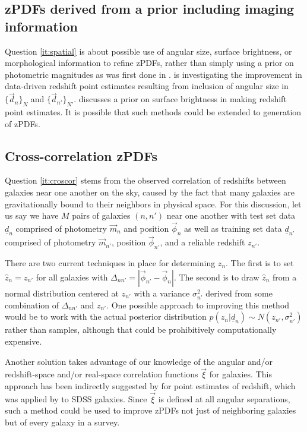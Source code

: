 \documentclass[12pt, onecolumn]{emulateapj}
\newcommand{\textul}{\underline}
\begin{document}
\subsection{zPDFs derived from a prior including imaging information}

Question \ref{it:spatial} is about possible use of angular size, surface brightness, or morphological information to refine zPDFs, rather than simply using a prior on photometric magnitudes as was first done in \citet{ben00}.  \citet{vak15} is investigating the improvement in data-driven redshift point estimates resulting from inclusion of angular size in $\{\vec{d}_{n}\}_{N}$ and $\{\vec{d}_{n'}\}_{N'}$.  \citet{sta07} discusses a prior on surface brightness in making redshift point estimates.  It is possible that such methods could be extended to generation of zPDFs.

\subsection{Cross-correlation zPDFs}

Question \ref{it:croscor} stems from the observed correlation of redshifts between galaxies near one another on the sky, caused by the fact that many galaxies are gravitationally bound to their neighbors in physical space.  For this discussion, let us say we have $M$ pairs of galaxies $(n,n')$ near one another with test set data $\textul{d}_{n}$ comprised of photometry $\vec{m}_{n}$ and position $\vec{\phi}_{n}$ as well as training set data $\textul{d}_{n'}$ comprised of photometry $\vec{m}_{n'}$, position $\vec{\phi}_{n'}$, and a reliable redshift $z_{n'}$.  

There are two current techniques in place for determining $z_{n}$.  The first is to set $\hat{z}_{n}=z_{n'}$ for all galaxies with $\Delta_{nn'}=|\vec{\phi}_{n'}-\vec{\phi}_{n}|$.  The second is to draw $\hat{z}_{n}$ from a normal distribution centered at $z_{n'}$ with a variance $\sigma^{2}_{n'}$ derived from some combination of $\Delta_{nn'}$ and $z_{n'}$.  One possible approach to improving this method would be to work with the actual posterior distribution $p(z_{n}|\textul{d}_{n})\sim N(z_{n'},\sigma^{2}_{n'})$ rather than samples, although that could be prohibitively computationally expensive.

Another solution takes advantage of our knowledge of the angular and/or redshift-space and/or real-space correlation functions $\vec{\xi}$ for galaxies.  This approach has been indirectly suggested by \citet{sch06} for point estimates of redshift, which was applied by \citet{rah14} to SDSS galaxies. Since $\vec{\xi}$ is defined at all angular separations, such a method could be used to improve zPDFs not just of neighboring galaxies but of every galaxy in a survey.  
\end{document}
